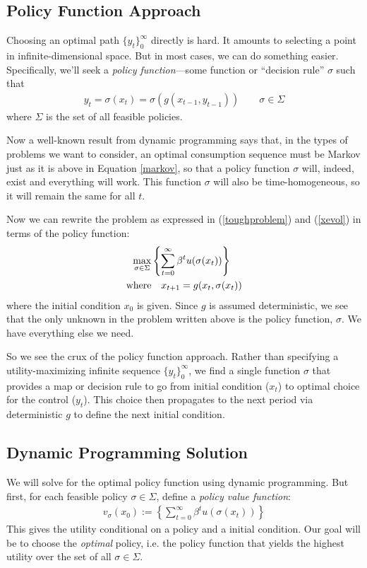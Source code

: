 \documentclass[a4paper,12pt]{scrartcl}
\begin{document}
\subsection{Policy Function Approach}

Choosing an optimal path $\{y_t\}_0^\infty$ directly is hard. It
amounts to selecting a point in infinite-dimensional space.
But in most cases, we can do something easier. Specifically,
we'll seek a \emph{policy function}---some function or
``decision rule'' $\sigma$ such that 
\begin{align}
  \label{markov}
  y_t = \sigma(x_t) = \sigma(g(x_{t-1}, y_{t-1}))
  \qquad \sigma \in \Sigma
\end{align}
where $\Sigma$ is the set of all feasible policies. 

Now a well-known result from dynamic programming says that, in
the types of problems we want to consider, an optimal
consumption sequence must be Markov just as it is above in
Equation \ref{markov}, so that a policy function $\sigma$ will,
indeed, exist and everything will work. This function $\sigma$
will also be time-homogeneous, so it will remain the same for
all $t$.

Now we can rewrite the problem as expressed in
(\ref{toughproblem}) and (\ref{xevol}) in terms of the policy
function:
\begin{align}
  \label{policyapproach}
  \max_{\sigma \in \Sigma} 
  &\left\{ \sum^\infty_{t=0} \beta^t u(\sigma(x_t)) \right\}\\
  \text{where} &\quad
  x_{t+1} = g(x_t, \sigma(x_t)) \notag
\end{align}
where the initial condition $x_0$ is given. Since $g$ is
assumed deterministic, we see that the only unknown in the
problem written above is the policy function, $\sigma$. We have
everything else we need.

So we see the crux of the policy function approach. Rather than
specifying a utility-maximizing infinite sequence
$\{y_t\}^\infty_0$, we find a single function $\sigma$ that
provides a map or decision rule to go from initial condition ($x_t$) to optimal choice for the control ($y_t$).
This choice then propagates to the next period via deterministic
$g$ to define the next initial condition.

\subsection{Dynamic Programming Solution}

We will solve for the optimal policy function using dynamic
programming. But first, for each feasible policy $\sigma\in
\Sigma$, define a \emph{policy value
function}:
\begin{align*}
  v_\sigma(x_0) :=
  \left\{ \sum^\infty_{t=0} \beta^t u(\sigma(x_t)) \right\}
\end{align*}
This gives the utility conditional on a policy and a initial
condition.  Our goal will be to choose the \emph{optimal}
policy, i.e. the policy function that yields the highest utility
over the set of all $\sigma \in \Sigma$.
\end{document}
